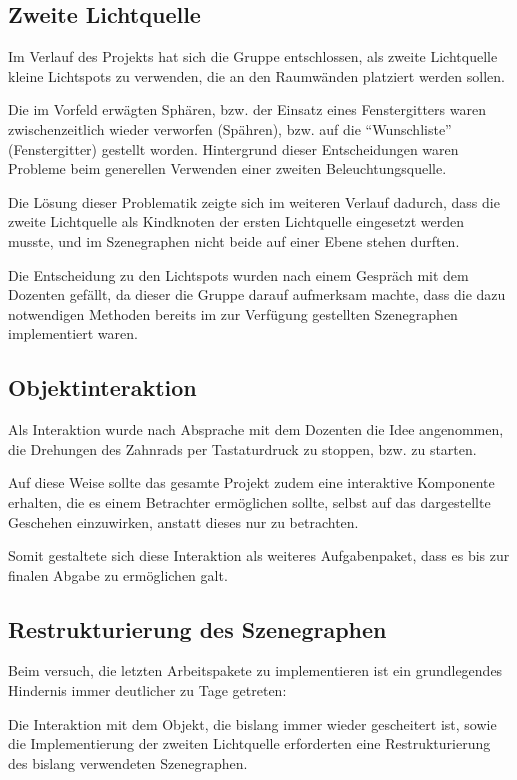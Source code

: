 \documentclass{article}
\begin{document}
\subsection{Zweite Lichtquelle}
Im Verlauf des Projekts hat sich die Gruppe entschlossen, als zweite 
Lichtquelle kleine Lichtspots zu verwenden, die an den Raumwänden platziert werden sollen. 

Die im Vorfeld erwägten Sphären, bzw. der Einsatz eines Fenstergitters waren zwischenzeitlich wieder verworfen (Spähren), bzw. auf die \enquote{Wunschliste} (Fenstergitter) gestellt worden. 
Hintergrund dieser Entscheidungen waren Probleme beim generellen Verwenden einer zweiten Beleuchtungsquelle. 

Die Lösung dieser Problematik zeigte sich im weiteren Verlauf dadurch, dass die zweite Lichtquelle als Kindknoten der ersten Lichtquelle eingesetzt werden musste, und im Szenegraphen nicht beide auf einer Ebene stehen durften. 

Die Entscheidung zu den Lichtspots wurden nach einem Gespräch mit dem Dozenten gefällt, da dieser die Gruppe darauf aufmerksam machte, dass die dazu notwendigen Methoden bereits im zur Verfügung gestellten Szenegraphen implementiert waren. 



\subsection{Objektinteraktion}
Als Interaktion wurde nach Absprache mit dem Dozenten die Idee angenommen, die Drehungen des Zahnrads per Tastaturdruck zu stoppen, bzw. zu starten. 

Auf diese Weise sollte das gesamte Projekt zudem eine interaktive Komponente erhalten, die es einem Betrachter ermöglichen sollte, selbst auf das dargestellte Geschehen einzuwirken, anstatt dieses nur zu betrachten. 

Somit gestaltete sich diese Interaktion als weiteres Aufgabenpaket, dass es bis zur finalen Abgabe zu ermöglichen galt. 



\subsection{Restrukturierung des Szenegraphen}
Beim versuch, die letzten Arbeitspakete zu implementieren ist ein grundlegendes Hindernis immer deutlicher zu Tage getreten: 

Die Interaktion mit dem Objekt, die bislang immer wieder gescheitert ist, sowie die Implementierung der zweiten Lichtquelle erforderten eine Restrukturierung des bislang verwendeten Szenegraphen. 
\end{document}
